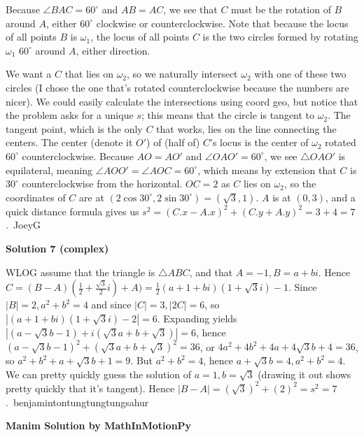 \begin{enumerate}
 Because $\angle BAC=60^\circ$ and $AB=AC$, we see that $C$ must be the rotation of $B$ around $A$, either $60^\circ$ clockwise or counterclockwise. Note that because the locus of all points $B$ is $\omega_1$, the locus of all points $C$ is the two circles formed by rotating $\omega_1$ $60^\circ$ around $A$, either direction. 

 We want a $C$ that lies on $\omega_2$, so we naturally intersect $\omega_2$ with one of these two circles (I chose the one that's rotated counterclockwise because the numbers are nicer). We could easily calculate the intersections using coord geo, but notice that the problem asks for a unique $s$; this means that the circle is tangent to $\omega_2$. The tangent point, which is the only $C$ that works, lies on the line connecting the centers. The center (denote it $O'$) of (half of) $C$'s locus is the center of $\omega_2$ rotated $60^\circ$ counterclockwise. Because $AO=AO'$ and $\angle OAO'=60^\circ$, we see $\triangle OAO'$ is equilateral, meaning $\angle AOO'=\angle AOC=60^\circ$, which means by extension that $C$ is $30^\circ$ counterclockwise from the horizontal. $OC=2$ as $C$ lies on $\omega_2$, so the coordinates of $C$ are at $(2\cos 30^\circ, 2\sin 30^\circ)=(\sqrt{3}, 1)$. $A$ is at $(0, 3)$, and a quick distance formula gives us $s^2=(C.x-A.x)^2+(C.y+A.y)^2=3+4=\boxed{7}$.~JoeyG

 



\textbf{Solution 7 (complex)}

WLOG assume that the triangle is $\triangle ABC$, and that $A=-1,B=a+bi$. Hence $C=(B-A)(\frac12+\frac{\sqrt3}2i)+A)=\frac12(a+1+bi)(1+\sqrt3i)-1$. Since $|B|=2, a^2+b^2=4$ and since $|C|=3,|2C|=6$, so $|(a+1+bi)(1+\sqrt3i)-2|=6$. Expanding yields $|(a-\sqrt3b-1)+i(\sqrt3a+b+\sqrt3)|=6$, hence $(a-\sqrt3b-1)^2+(\sqrt3a+b+\sqrt3)^2=36$, or $4a^2+4b^2+4a+4\sqrt3b+4=36$, so $a^2+b^2+a+\sqrt3b+1=9$. But $a^2+b^2=4$, hence $a+\sqrt3b=4, a^2+b^2=4$. We can pretty quickly guess the solution of $a=1, b=\sqrt3$ (drawing it out shows pretty quickly that it's tangent). Hence $|B-A|=(\sqrt3)^2+(2)^2=s^2=7$.~benjamintontungtungtungsahur

 \textbf{Manim Solution by MathInMotionPy} 


\end{enumerate}